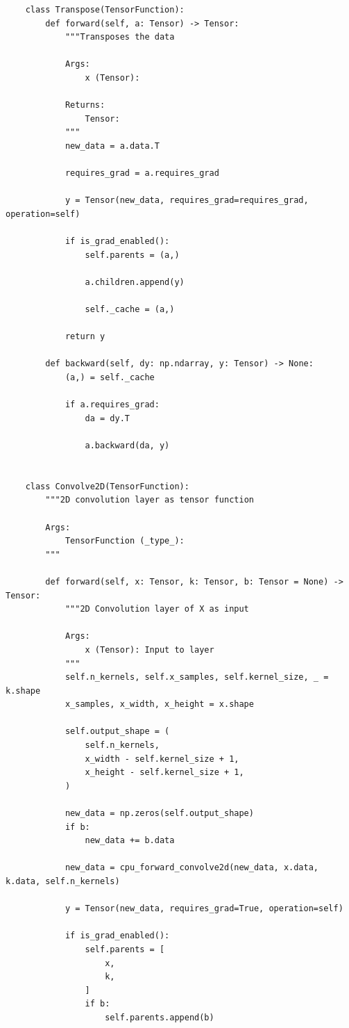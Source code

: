 \documentclass{article}
\begin{document}
\begin{verbatim}
    class Transpose(TensorFunction):
        def forward(self, a: Tensor) -> Tensor:
            """Transposes the data

            Args:
                x (Tensor):

            Returns:
                Tensor:
            """
            new_data = a.data.T

            requires_grad = a.requires_grad

            y = Tensor(new_data, requires_grad=requires_grad, operation=self)

            if is_grad_enabled():
                self.parents = (a,)

                a.children.append(y)

                self._cache = (a,)

            return y

        def backward(self, dy: np.ndarray, y: Tensor) -> None:
            (a,) = self._cache

            if a.requires_grad:
                da = dy.T

                a.backward(da, y)


    class Convolve2D(TensorFunction):
        """2D convolution layer as tensor function

        Args:
            TensorFunction (_type_):
        """

        def forward(self, x: Tensor, k: Tensor, b: Tensor = None) -> Tensor:
            """2D Convolution layer of X as input

            Args:
                x (Tensor): Input to layer
            """
            self.n_kernels, self.x_samples, self.kernel_size, _ = k.shape
            x_samples, x_width, x_height = x.shape

            self.output_shape = (
                self.n_kernels,
                x_width - self.kernel_size + 1,
                x_height - self.kernel_size + 1,
            )

            new_data = np.zeros(self.output_shape)
            if b:
                new_data += b.data

            new_data = cpu_forward_convolve2d(new_data, x.data, k.data, self.n_kernels)

            y = Tensor(new_data, requires_grad=True, operation=self)

            if is_grad_enabled():
                self.parents = [
                    x,
                    k,
                ]
                if b:
                    self.parents.append(b)


\end{verbatim}
\end{document}
